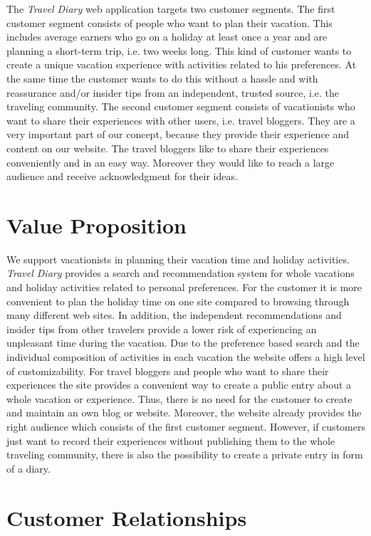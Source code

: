 \documentclass[IN,english]{tumbook}
\begin{document}
The \emph{Travel Diary} web application targets two customer segments. The first customer segment consists of people who want to plan their vacation. This includes average earners who go on a holiday at least once a year and are planning a short-term trip, i.e. two weeks long. This kind of customer wants to create a unique vacation experience with activities related to his preferences. At the same time the customer wants to do this without a hassle and with reassurance and/or insider tips from an independent, trusted source, i.e. the traveling community. The second customer segment consists of vacationists who want to share their experiences with other users, i.e. travel bloggers. They are a very important part of our concept, because they provide their experience and content on our website. The travel bloggers like to share their experiences conveniently and in an easy way. Moreover they would like to reach a large audience and receive acknowledgment for their ideas.

\section{Value Proposition}

We support vacationists in planning their vacation time and holiday activities. \emph{Travel Diary} provides a search and recommendation system for whole vacations and holiday activities related to personal preferences. For the customer it is more convenient to plan the holiday time on one site compared to browsing through many different web sites. In addition, the independent recommendations and insider tips from other travelers provide a lower risk of experiencing an unpleasant time during the vacation. Due to the preference based search and the individual composition of activities in each vacation the website offers a high level of customizability.
For travel bloggers and people who want to share their experiences the site provides a convenient way to create a public entry about a whole vacation or experience. Thus, there is no need for the customer to create and maintain an own blog or website. Moreover, the website already provides the right audience which consists of the first customer segment. However, if customers just want to record their experiences without publishing them to the whole traveling community, there is also the possibility to create a private entry in form of a diary.


\section{Customer Relationships}
\end{document}
